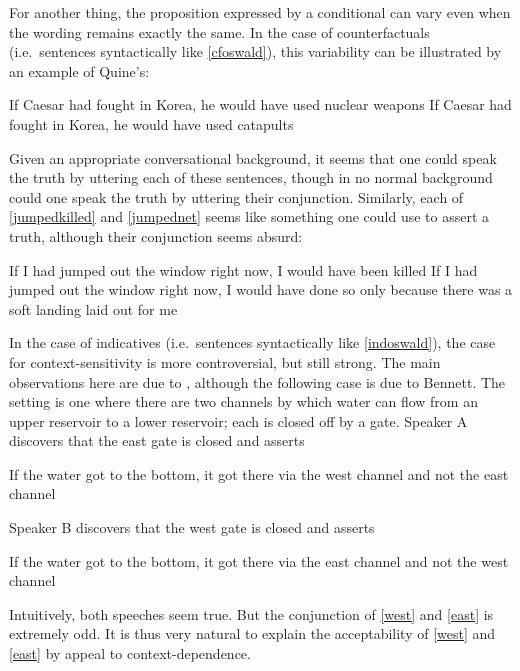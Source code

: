 \documentclass[If.tex]{subfiles}
\begin{document}
For another thing, the proposition expressed by a conditional can vary even when the wording remains exactly the same. In the case of counterfactuals (i.e.~sentences syntactically like \ref{cfoswald}), this variability can be illustrated by an example of Quine's:
\begin{prop}
	\nitem
	\begin{prop}
		\aitem \label{nukes}
			If Caesar had fought in Korea, he would have used nuclear weapons
		\aitem \label{catapults}
			If Caesar had fought in Korea, he would have used catapults
	\end{prop}
\end{prop}
Given an appropriate conversational background, it seems that one could speak the truth by uttering each of these sentences, though in no normal background could one speak the truth by uttering their conjunction. Similarly, each of \ref{jumpedkilled} and \ref{jumpednet} \citep{JacksonCTC} seems like something one could use to assert a truth, although their conjunction seems absurd:
\begin{prop}
	\nitem	
	\begin{prop}
		\aitem \label{jumpedkilled}
		If I had jumped out the window right now, I would have been killed
		\aitem \label{jumpednet}
		If I had jumped out the window right now, I would have done so only because there was a soft landing laid out for me
	\end{prop}
\end{prop}
In the case of indicatives (i.e.~sentences syntactically like \ref{indoswald}), the case for context-sensitivity is more controversial, but still strong. The main observations here are due to \citet{GibbardTRTC}, although the following case is due to Bennett. The setting is one where there are two channels by which water can flow from an upper reservoir to a lower reservoir; each is closed off by a gate. Speaker A discovers that the east gate is closed and asserts
\begin{prop}
	\nitem \label{west}
	If the water got to the bottom, it got there via the west channel and not the east channel
\end{prop}
Speaker B discovers that the west gate is closed and asserts
\begin{prop}
	\nitem \label{east}
	If the water got to the bottom, it got there via the east channel and not the west channel
\end{prop}
Intuitively, both speeches seem true.  But the conjunction of \ref{west} and \ref{east} is extremely odd. It is thus very natural to explain the acceptability of \ref{west} and \ref{east} by appeal to context-dependence.
\end{document}
